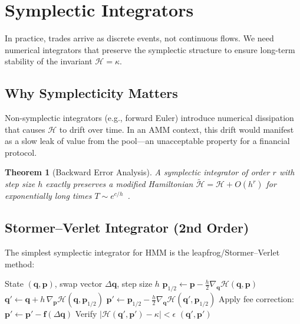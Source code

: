 \documentclass[11pt,twocolumn]{article}
\newtheorem{theorem}{Theorem}
\begin{document}
\section{Symplectic Integrators}
\label{sec:integrators}

In practice, trades arrive as discrete events, not continuous flows. We need numerical integrators that preserve the symplectic structure to ensure long-term stability of the invariant $\mathcal{H} = \kappa$.

\subsection{Why Symplecticity Matters}

Non-symplectic integrators (e.g., forward Euler) introduce numerical dissipation that causes $\mathcal{H}$ to drift over time. In an AMM context, this drift would manifest as a slow leak of value from the pool---an unacceptable property for a financial protocol.

\begin{theorem}[Backward Error Analysis]
A symplectic integrator of order $r$ with step size $h$ exactly preserves a modified Hamiltonian $\tilde{\mathcal{H}} = \mathcal{H} + O(h^r)$ for exponentially long times $T \sim e^{c/h}$~\cite{hairer2006geometric}.
\end{theorem}

\subsection{Stormer--Verlet Integrator (2nd Order)}

The simplest symplectic integrator for HMM is the leapfrog/Stormer--Verlet method:

\begin{algorithm}[H]
\caption{Stormer--Verlet Swap Execution}
\label{alg:verlet}
\begin{algorithmic}[1]
\Require State $(\bm{q}, \bm{p})$, swap vector $\Delta\bm{q}$, step size $h$
\State $\bm{p}_{1/2} \gets \bm{p} - \frac{h}{2} \nabla_{\bm{q}} \mathcal{H}(\bm{q}, \bm{p})$
\State $\bm{q}' \gets \bm{q} + h \, \nabla_{\bm{p}} \mathcal{H}(\bm{q}, \bm{p}_{1/2})$
\State $\bm{p}' \gets \bm{p}_{1/2} - \frac{h}{2} \nabla_{\bm{q}} \mathcal{H}(\bm{q}', \bm{p}_{1/2})$
\State Apply fee correction: $\bm{p}' \gets \bm{p}' - \bm{f}(\Delta\bm{q})$
\State Verify $|\mathcal{H}(\bm{q}', \bm{p}') - \kappa| < \epsilon$
\State \Return $(\bm{q}', \bm{p}')$
\end{algorithmic}
\end{algorithm}
\end{document}
